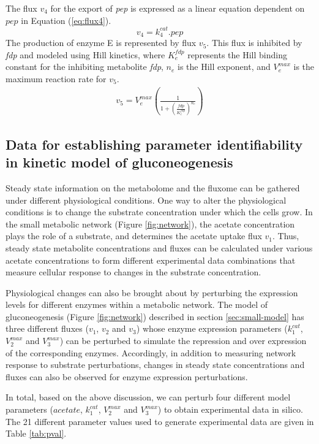 \documentclass[10pt]{article}
\begin{document}
	The flux $v_4$ for the export of \textit{pep} is expressed as a linear equation dependent on $pep$ in Equation (\ref{eq:flux4}).
	\begin{equation}\label{eq:flux4}
	v_4 = k_{4}^{cat}.pep
	\end{equation}		
	The production of enzyme E is represented by flux $v_5$. This flux is inhibited by \textit{fdp} and modeled using Hill kinetics, where $K_e^{fdp}$ represents the Hill binding constant for the inhibiting metabolite \textit{fdp}, $n_e$ is the Hill exponent, and $V_e^{max}$ is the maximum reaction rate for $v_5$.
	\begin{align}\label{eq:flux5}
	v_5 = V_e^{max}\left(\frac{1}{1+\left(\frac{fdp}{K_{e}^{fdp}}\right)^{n_e}}\right)
	\end{align}
	
	\subsection{Data for establishing parameter identifiability in kinetic model of gluconeogenesis}\label{sec:experiments}
	Steady state information on the metabolome and the fluxome can be gathered under different physiological conditions. One way to alter the physiological conditions is to change the substrate concentration under which the cells grow. In the small metabolic network (Figure \ref{fig:network}), the acetate concentration plays the role of a substrate, and  determines the acetate uptake flux $v_1$. Thus, steady state metabolite concentrations and fluxes can be calculated under various acetate concentrations to form different experimental data combinations that measure cellular response to changes in the substrate concentration. 
	
	Physiological changes can also be brought about by perturbing the expression levels for different enzymes within a metabolic network. The model of gluconeogenesis (Figure \ref{fig:network}) described in section \ref{sec:small-model} has three different fluxes ($v_1$, $v_2$ and $v_3$) whose enzyme expression parameters ($k_1^{cat}$, $V_2^{max}$ and $V_3^{max}$) can be perturbed to simulate the repression and over expression of the corresponding enzymes. Accordingly, in addition to measuring network response to substrate perturbations, changes in steady state concentrations and fluxes can also be observed for enzyme expression perturbations.
	
	In total, based on the above discussion, we can perturb four different model parameters ($acetate$, $k_1^{cat}$, $V_2^{max}$ and $V_3^{max}$) to obtain experimental data in silico. The 21 different parameter values used to generate experimental data are given in Table \ref{tab:pval}.	
	
\end{document}
